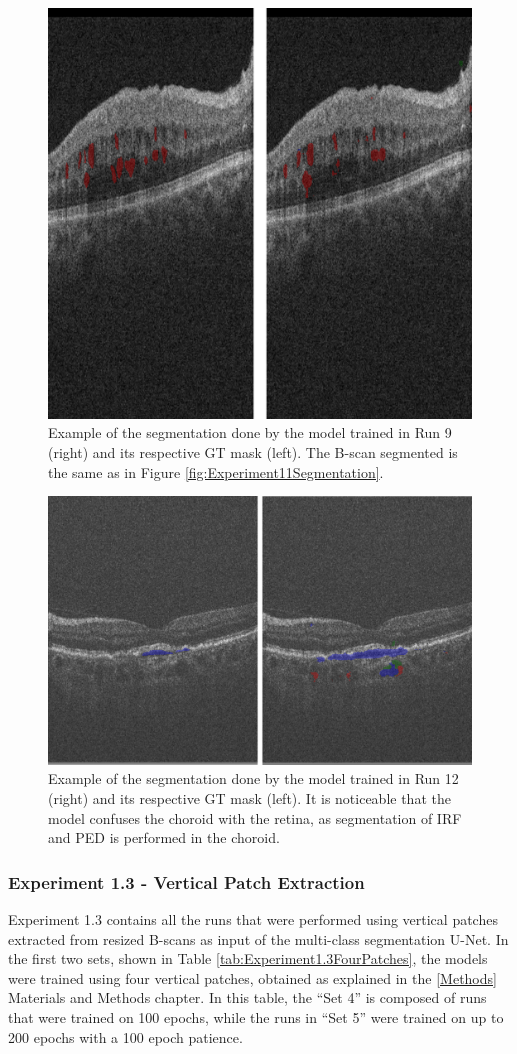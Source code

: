 \begin{figure}[!ht]
	\centering
	\includegraphics[width=0.5\linewidth]{figures/BigPatchSegmentationCirrus.png}
	\caption{Example of the segmentation done by the model trained in Run 9 (right) and its respective GT mask (left). The B-scan segmented is the same as in Figure \ref{fig:Experiment11Segmentation}.}
	\label{fig:BigPatchesSegmentationCirrus}
\end{figure}

\begin{figure}[!ht]
	\centering
	\includegraphics[width=0.6\linewidth]{figures/BigPatchSegmentationTopcon.png}
	\caption{Example of the segmentation done by the model trained in Run 12 (right) and its respective GT mask (left). It is noticeable that the model confuses the choroid with the retina, as segmentation of IRF and PED is performed in the choroid.}
	\label{fig:BigPatchesSegmentationTopcon}
\end{figure}

\subsubsection{Experiment 1.3 - Vertical Patch Extraction}
Experiment 1.3 contains all the runs that were performed using vertical patches extracted from resized B-scans as input of the multi-class segmentation U-Net. In the first two sets, shown in Table \ref{tab:Experiment1.3FourPatches}, the models were trained using four vertical patches, obtained as explained in the \ref{Methods} Materials and Methods chapter. In this table, the ``Set 4'' is composed of runs that were trained on 100 epochs, while the runs in ``Set 5'' were trained on up to 200 epochs with a 100 epoch patience.

